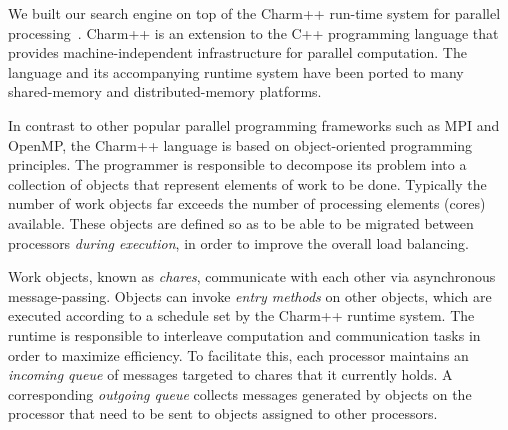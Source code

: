 \documentclass[times, 10pt,twocolumn]{article}
\begin{document}
\begin{figure}[htpb]
\small
\begin{boxedminipage}{\columnwidth}
\begin{algorithmic}[1]
  \EndIf
\EndFunction
\label{codelisting}
\end{algorithmic}
\end{boxedminipage}
\end{figure}

We built our search engine on top of the {\sc Charm++} run-time
system for parallel processing~\cite{kale93charm,kale09charm}.  {\sc Charm++}
is an extension to the C++ programming language that provides
machine-independent infrastructure for parallel computation.  The language and
its accompanying runtime system have been ported to many shared-memory and
distributed-memory platforms.

In contrast to other popular parallel programming frameworks such as {\sc MPI}
and {\sc OpenMP}, the {\sc Charm++} language is based on object-oriented
programming principles.  The programmer is responsible to decompose its problem
into a collection of objects that represent elements of work to be done.
Typically the number of work objects far exceeds the number of processing
elements (cores) available.  These objects are defined so as to be able to be
migrated between processors {\em during execution}, in order to improve the
overall load balancing.  

Work objects, known as {\em chares}, communicate with each other via
asynchronous message-passing.  Objects can invoke {\em entry methods} on other
objects, which are executed according to a schedule set by the {\sc Charm++}
runtime system.  The runtime is responsible to interleave computation and
communication tasks in order to maximize efficiency.  To facilitate this, each
processor maintains an {\em incoming queue} of messages targeted to chares that
it currently holds.  A corresponding {\em outgoing queue} collects messages
generated by objects on the processor that need to be sent to objects assigned
to other processors.
\end{document}
